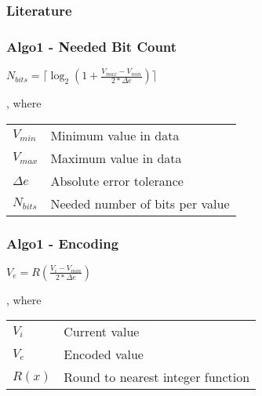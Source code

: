 \documentclass[compress]{beamer}
\begin{document}
\begin{frame}
	\frametitle{Literature}

	
	
\end{frame}

\appendix

\begin{frame}
	\frametitle{Algo1 - Needed Bit Count}

	\begin{center}
		$N_{bits}=\lceil\log_2{\left(1 + \frac{V_{max} - V_{min}}{2 * \Delta{e}}\right)}\rceil$
	\end{center}

	\bigskip

	, where\\

	\bigskip

	\begin{tabular}{ll}
		$V_{min}$ & Minimum value in data \\
		$V_{max}$ & Maximum value in data \\
		$\Delta{e}$ & Absolute error tolerance \\
		$N_{bits}$ & Needed number of bits per value
	\end{tabular}

\end{frame}

\begin{frame}
	\frametitle{Algo1 - Encoding}

	\begin{center}
		$V_e = R\left(\frac{V_i - V_{min}}{2 * \Delta{e}}\right)$
	\end{center}

	\bigskip

	, where\\

	\bigskip

	\begin{tabular}{ll}
		$V_i$ & Current value \\
		$V_e$ & Encoded value \\
		$R\left(x\right)$ & Round to nearest integer function
	\end{tabular}

\end{frame}
\end{document}
